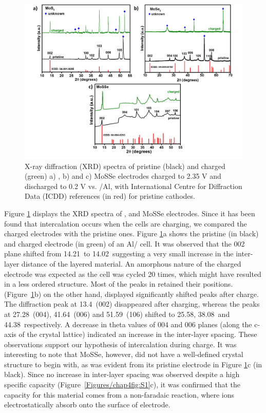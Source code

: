 \begin{figure}[htb!]
\centering
\includegraphics[width=\textwidth]{Figures/chap4fig/XRD}
\caption{X-ray diffraction (XRD) spectra of pristine (black) and charged (green) a) , b)  and c) MoSSe electrodes charged to 2.35 V and discharged to 0.2 V vs. /Al, with International Centre for Diffraction Data (ICDD) references (in red) for pristine cathodes.}
\label{Figures/chap4fig:XRD}
\end{figure}
Figure \ref{Figures/chap4fig:XRD} displays the XRD spectra of ,  and MoSSe electrodes. Since it has been found that intercalation occurs when the cells are charging, we compared the charged electrodes with the pristine ones. Figure \ref{Figures/chap4fig:XRD}a shows the pristine (in black) and charged electrode (in green) of an Al/ cell. It was observed that the 002 plane shifted from 14.21\degree\ to 14.02\degree\ suggesting a very small increase in the inter-layer distance of the layered material. An amorphous nature of the charged electrode was expected as the cell was cycled 20 times, which might have resulted in a less ordered structure. Most of the peaks in  retained their positions.  (Figure\ \ref{Figures/chap4fig:XRD}b) on the other hand, displayed significantly shifted peaks after charge. The diffraction peak at 13.4\degree\ (002) disappeared after charging, whereas the peaks at 27.28\degree\ (004), 41.64\degree\ (006) and 51.59\degree\ (106) shifted to 25.58\degree , 38.08\degree\  and 44.38\degree\ respectively. A decrease in theta values of 004 and 006 planes (along the c-axis of the crystal lattice) indicated an increase in the inter-layer spacing. These observations support our hypothesis of  intercalation during charge. It was interesting to note that MoSSe, however, did not have a well-defined crystal structure to begin with, as was evident from its pristine electrode in Figure \ref{Figures/chap4fig:XRD}c (in black). Since no increase in inter-layer spacing was observed despite a high specific capacity (Figure\ \ref{Figures/chap4fig:S1}c), it was confirmed that the capacity for this material comes from a non-faradaic reaction,  where ions electrostatically absorb onto the surface of electrode. 


